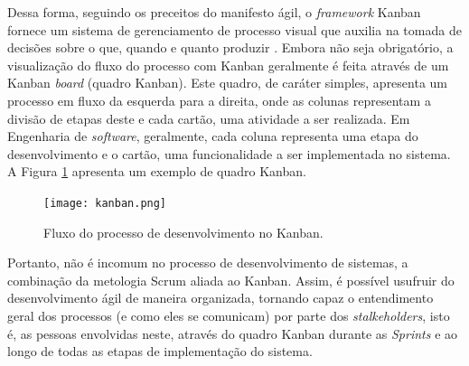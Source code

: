Dessa forma, seguindo os preceitos do manifesto ágil, o \textit{framework} Kanban fornece um sistema de gerenciamento de processo visual que auxilia na tomada de decisões sobre o que, quando e quanto produzir \cite{kanbanBook2}. Embora não seja obrigatório, a visualização do fluxo do processo com Kanban geralmente é feita através de um Kanban \textit{board} (quadro Kanban). Este quadro, de caráter simples, apresenta um processo em fluxo da esquerda para a direita, onde as colunas representam a divisão de etapas deste e cada cartão, uma atividade a ser realizada. Em Engenharia de \textit{software}, geralmente, cada coluna representa uma etapa do desenvolvimento e o cartão, uma funcionalidade a ser implementada no sistema. A Figura \ref{kanbanFlow} apresenta um exemplo de quadro Kanban.

\begin{figure}[ht]
    \caption{Fluxo do processo de desenvolvimento no Kanban.}
       	\begin{center}
            \texttt{[image: kanban.png]}
        \end{center}
    \label{kanbanFlow}
\end{figure}

Portanto, não é incomum no processo de desenvolvimento de sistemas, a combinação da metologia Scrum aliada ao Kanban. Assim, é possível usufruir do desenvolvimento ágil de maneira organizada, tornando capaz o entendimento geral dos processos (e como eles se comunicam) por parte dos \textit{stalkeholders}, isto é, as pessoas envolvidas neste, através do quadro Kanban durante as \textit{Sprints} e ao longo de todas as etapas de implementação do sistema.